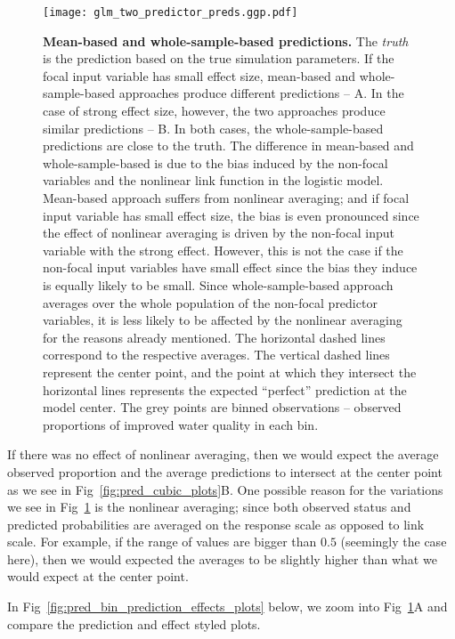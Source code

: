 \begin{figure}
\begin{center}
\texttt{[image: glm\_two\_predictor\_preds.ggp.pdf]}
\end{center}
\caption{{\bf Mean-based and whole-sample-based predictions.} The \emph{truth} is the prediction based on the true simulation parameters. If the focal input variable has small effect size, mean-based and whole-sample-based approaches produce different predictions -- A. In the case of strong effect size, however, the two approaches produce similar predictions -- B. In both cases, the whole-sample-based predictions are close to the truth. The difference in mean-based and whole-sample-based is due to the bias induced by the non-focal variables and the nonlinear link function in the logistic model. Mean-based approach suffers from nonlinear averaging; and if focal input variable has small effect size, the bias is even pronounced since the effect of nonlinear averaging is driven by the non-focal input variable with the strong effect. However, this is not the case if the non-focal input variables have small effect since the bias they induce is equally likely to be small. Since whole-sample-based approach averages over the whole population of the non-focal predictor variables, it is less likely to be affected by the nonlinear averaging for the reasons already mentioned. The horizontal dashed lines correspond to the respective averages. The vertical dashed lines represent the center point, and the point at which they intersect the horizontal lines represents the expected ``perfect'' prediction at the model center. The grey points are binned observations -- observed proportions of improved water quality in each bin.} 
\label{fig:pred_bin_plots}
\end{figure}

If there was no effect of nonlinear averaging, then we would expect the average observed proportion and the average predictions to intersect at the center point as we see in Fig~\ref{fig:pred_cubic_plots}B. One possible reason for the variations we see in Fig~\ref{fig:pred_bin_plots} is the nonlinear averaging; since both observed status and predicted probabilities are averaged on the response scale as opposed to link scale. For example, if the range of values are bigger than $0.5$ (seemingly the case here), then we would expected the averages to be slightly higher than what we would expect at the center point.

In Fig~\ref{fig:pred_bin_prediction_effects_plots} below, we zoom into Fig~\ref{fig:pred_bin_plots}{A} and compare the prediction and effect styled plots. 

